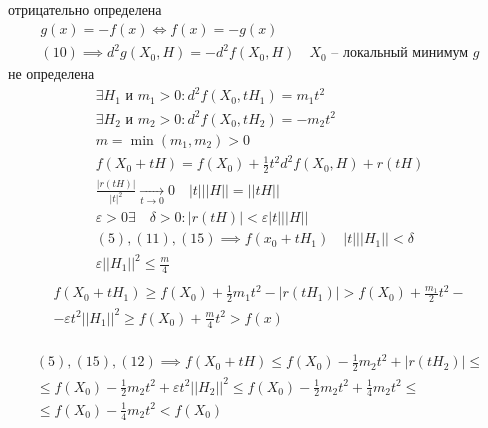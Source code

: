 \documentclass[main]{subfiles}
\begin{document}
\begin{longProof}
        отрицательно определена 
        \begin{gather*}
            g(x) = -f(x) \Leftrightarrow f(x) = - g(x) \\
            (10) \implies d^2g(X_0,H) = -d^2f(X_0,H) \quad X_0 \text{  -- локальный минимум } g \tag{10\prime}
        \end{gather*}
        не определена
        \begin{gather*}
            \exists H_1 \text{ и } m_1 > 0 : d^2f(X_0,tH_1) = m_1t^2 \tag{11}\\
            \exists H_2 \text{ и } m_2 > 0: d^2f(X_0,tH_2) = -m_2t^2 \tag{12} \\
            m = \min(m_1, m_2) > 0 \\
            f(X_0 + tH) = f(X_0) + \frac{1}{2} t^2 d^2f(X_0,H) + r(tH) \tag{13}\\
            \frac{|r(tH)|}{|t|^2} \underset{t \to 0}{\rightarrow} 0 \quad |t|||H|| = ||tH|| \tag{14} \\
            \varepsilon > 0 \exists \quad  \delta > 0 : |r(tH)| < \varepsilon|t|||H|| \tag{15} \\
            (5), (11), (15) \implies f(x_0 + tH_1) \quad |t|||H_1|| < \delta \\
            \varepsilon||H_1||^2 \leq \frac{m}{4} \tag{17} \\
        \end{gather*}
        \begin{multline*}
            f(X_0 + tH_1) \geq f(X_0) + \frac{1}{2} m_1t^2 - |r(tH_1)| > f(X_0) + \frac{m_1}{2}t^2 - \\
            - \varepsilon t^2||H_1||^2 \geq f(X_0) + \frac{m}{4}t^2 > f(x)  \tag{16} \\
        \end{multline*}

        \begin{multline*}
            (5), (15), (12) \implies f(X_0 + tH) \leq f(X_0) - \frac{1}{2} m_2t^2 + |r(tH_2)| \leq \\
            \leq f(X_0) - \frac{1}{2} m_2t^2 + \varepsilon t^2||H_2||^2 \leq f(X_0) - \frac{1}{2}m_2t^2 + \frac{1}{4}m_2t^2 \leq \\
            \leq f(X_0) - \frac{1}{4}m_2t^2 < f(X_0) \tag{18}
        \end{multline*}
\end{longProof}
\end{document}

